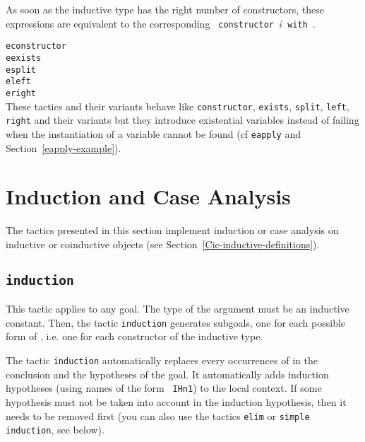 \begin{Variants}
  As soon as the inductive type has the right number of constructors,
    these expressions are equivalent to the corresponding {\tt
    constructor $i$ with \bindinglist}.

\item \texttt{econstructor}\\
      \texttt{eexists}\\
      \texttt{esplit}\\
      \texttt{eleft}\\
      \texttt{eright}\\

  These tactics and their variants behave like \texttt{constructor},
  \texttt{exists}, \texttt{split}, \texttt{left}, \texttt{right} and
  their variants but they introduce existential variables instead of
  failing when the instantiation of a variable cannot be found (cf
  \texttt{eapply} and Section~\ref{eapply-example}).

\end{Variants}

\section[Induction and Case Analysis]{Induction and Case Analysis
\label{Tac-induction}}

The tactics presented in this section implement induction or case
analysis on inductive or coinductive objects (see
Section~\ref{Cic-inductive-definitions}).

\subsection{\tt induction \term
{}}

This tactic applies to any goal. The type of the argument {\term} must
be an inductive constant. Then, the tactic {\tt induction}
generates subgoals, one for each possible form of {\term}, i.e. one
for each constructor of the inductive type.

The tactic {\tt induction} automatically replaces every occurrences
of {\term} in the conclusion and the hypotheses of the goal.  It
automatically adds induction hypotheses (using names of the form {\tt
  IHn1}) to the local context. If some hypothesis must not be taken
into account in the induction hypothesis, then it needs to be removed
first (you can also use the tactics {\tt elim} or {\tt simple induction},
see below).

